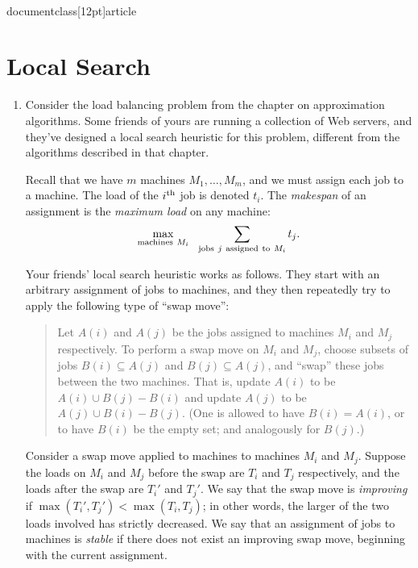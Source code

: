 \\documentclass[12pt]{article}
\begin{document}
\section{Local Search}


\begin{enumerate}


\item 

Consider the load balancing problem from the chapter on approximation
algorithms.
Some friends of yours are running a collection of Web servers,
and they've designed a local search heuristic
for this problem, different from the algorithms described in that chapter.

Recall that we have $m$ machines $M_1, \ldots, M_m$,
and we must assign each job to a machine.
The load of the $i^{\rm th}$ job is denoted $t_i$.
The {\em makespan} of an assignment
is the {\em maximum load} on any machine:
$$\max_{{\rm machines}~M_i} ~~ \sum_{{\rm jobs}~j~{\rm assigned~to}~M_i} t_j.$$

Your friends' local search heuristic works as follows.
They start with an arbitrary assignment
of jobs to machines, and they then repeatedly try to apply the
following type of ``swap move'':
\begin{quote}
Let $A(i)$ and $A(j)$ be the jobs assigned to machines
$M_i$ and $M_j$ respectively.
To perform a swap move on $M_i$ and $M_j$,
choose subsets of jobs $B(i) \subseteq A(j)$
and $B(j) \subseteq A(j)$,
and ``swap'' these jobs between the two machines.
That is, update $A(i)$ to be $A(i) \cup B(j) - B(i)$
and update $A(j)$ to be $A(j) \cup B(i) - B(j)$.
(One is allowed to have $B(i) = A(i)$, or to have $B(i)$
be the empty set; and analogously for $B(j)$.)
\end{quote}

Consider a swap move applied to machines to machines $M_i$ and $M_j$.
Suppose the loads on $M_i$ and $M_j$ before the swap
are $T_i$ and $T_j$ respectively,
and the loads after the swap are $T_i'$ and $T_j'$.
We say that the swap move is {\em improving} if
$\max(T_i', T_j') < \max(T_i, T_j)$;
in other words, the larger of the two loads involved
has strictly decreased.
We say that an assignment of jobs to machines is
{\em stable} if there does not exist an improving swap move,
beginning with the current assignment.


\end{enumerate}
\end{document}
